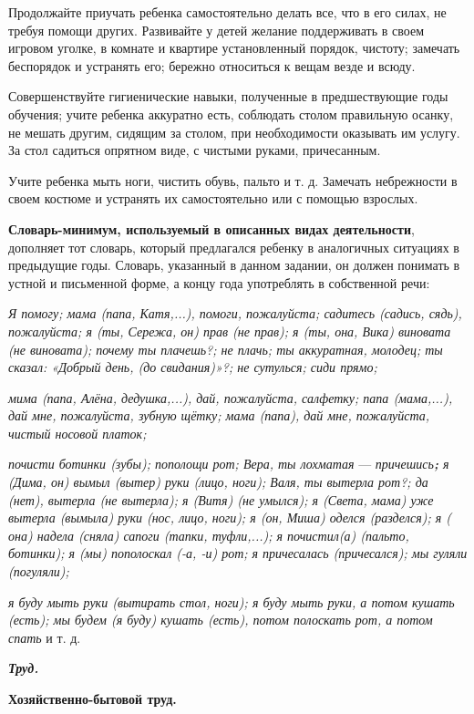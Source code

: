 \documentclass[a5paper]{book}
\renewcommand{\emph}[1]{\textit{#1}}
\begin{document}
Продолжайте приучать ребенка самостоятельно делать все, что в его силах,
не требуя помощи других. Развивайте у детей желание поддерживать в своем
игровом уголке, в комнате и квартире установленный порядок, чистоту;
замечать беспорядок и устранять его; бережно относиться к вещам везде и
всюду.

Совершенствуйте гигиенические навыки, полученные в предшествующие годы
обучения; учите ребенка аккуратно есть, соблюдать столом правильную
осанку, не мешать другим, сидящим за столом, при необходимости оказывать
им услугу. За стол садиться опрятном виде, с чистыми руками,
причесанным.

Учите ребенка мыть ноги, чистить обувь, пальто и т. д. Замечать
небрежности в своем костюме и устранять их самостоятельно или с помощью
взрослых.

\textbf{Словарь-минимум, используемый в описанных видах деятельности},
дополняет тот словарь, который предлагался ребенку в аналогичных
ситуациях в предыдущие годы. Словарь, указанный в данном задании, он
должен понимать в устной и письменной форме, а концу года употреблять в
собственной речи:

\emph{Я помогу; мама (папа, Катя,...), помоги, пожалуйста; садитесь
(садись, сядь), пожалуйста; я (ты, Сережа, он) прав (не прав); я (ты,
она, Вика) виновата (не виновата); почему ты плачешь?; не плачь; ты
аккуратная, молодец; ты сказал: «Добрый день, (до свидания)»?; не
сутулься; сиди прямо;}

\emph{мима (папа, Алёна, дедушка,...), дай, пожалуйста, салфетку; папа
(мама,...), дай мне, пожалуйста, зубную щётку; мама (папа), дай мне,
пожалуйста, чистый носовой платок;}

\emph{почисти ботинки (зубы); пополощи рот; Вера, ты лохматая} ---
\emph{причешись\textbf{;} я (Дима, он) вымыл (вытер) руки (лицо, ноги);
Валя, ты вытерла рот?; да (нет), вытерла (не вытерла); я (Витя) (не
умылся); я (Света, мама) уже вытерла (вымыла) руки (нос, лицо, ноги); я
(он, Миша) оделся (разделся); я ( она) надела (сняла) сапоги (тапки,
туфли,...); я почистил(а) (пальто, ботинки); я (мы) пополоскал (-а, -и)
рот; я причесалась (причесался); мы гуляли (погуляли);}

\emph{я буду мыть руки (вытирать стол, ноги); я буду мыть руки, а потом
кушать (есть); мы будем (я буду) кушать (есть), потом полоскать рот, а
потом спать} и т. д.

\emph{\textbf{Труд.}}

\textbf{Хозяйственно-бытовой труд.}
\end{document}
